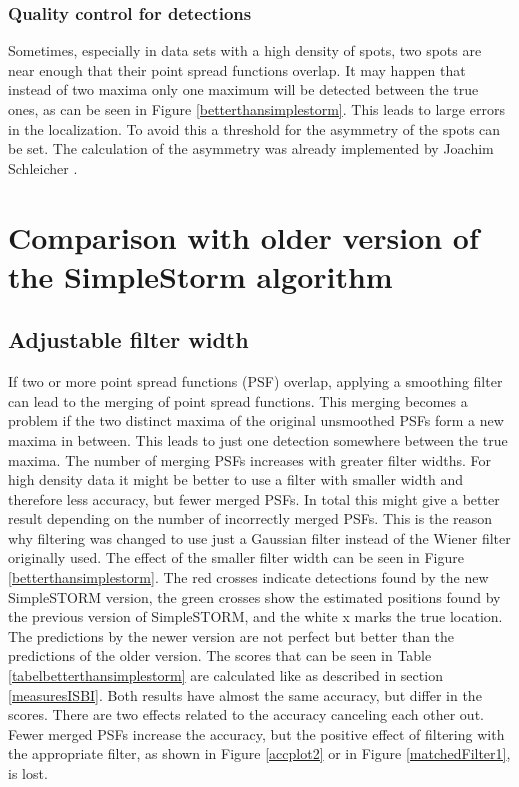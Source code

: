 \subsubsection{Quality control for detections}
Sometimes, especially in data sets with a high density of spots, two spots are near enough that their point spread functions overlap. It may happen that instead of two maxima only one maximum will be detected between the true ones, as can be seen in Figure \ref{betterthansimplestorm}. This leads to large errors in the localization. To avoid this a threshold for the asymmetry of the spots can be set.\newline
The calculation of the asymmetry was already implemented by Joachim Schleicher \cite{MAJoachim}.


\section{Comparison with older version of the SimpleStorm algorithm}
\subsection{Adjustable filter width} \label{sectionFilterisEvil}
If two or more point spread functions (PSF) overlap, applying a smoothing filter can lead to the merging of point spread functions. This merging becomes a problem if the two distinct maxima of the original unsmoothed PSFs form a new maxima in between. This leads to just one detection somewhere between the true maxima. The number of merging PSFs increases with greater filter widths. For high density data it might be better to use a filter with smaller width and therefore less accuracy, but fewer merged PSFs. In total this might give a better result depending on the number of incorrectly merged PSFs. This is the reason why filtering was changed to use just a Gaussian filter instead of the Wiener filter originally used. 
The effect of the smaller filter width can be seen in Figure \ref{betterthansimplestorm}. The red crosses indicate detections found by the new SimpleSTORM version, the green crosses show the estimated positions found by the previous version of SimpleSTORM, and the white x marks the true location. The predictions by the newer version are not perfect but better than the predictions of the older version. The scores that can be seen in Table \ref{tabelbetterthansimplestorm} are calculated like as described in section \ref{measuresISBI}. Both results have almost the same accuracy, but differ in the scores. There are two effects related to the accuracy canceling each other out. Fewer merged PSFs increase the accuracy, but the positive effect of filtering with the appropriate filter, as shown in Figure \ref{accplot2} or in Figure \ref{matchedFilter1}, is lost.

